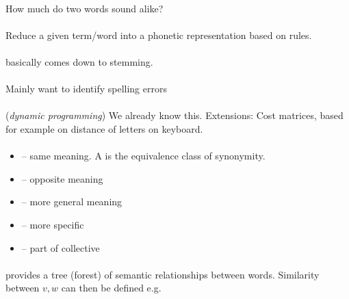 \documentclass[10pt,twocolumn]{article}
\begin{document}
\paragraph{} How much do two words sound alike?

\paragraph{ } Reduce a given term/word into a phonetic
representation based on rules.

\paragraph{} basically comes down to stemming.

\paragraph{} Mainly want to identify spelling errors

\paragraph{} (\textit{dynamic
  programming}) We already know this. Extensions: Cost matrices, based for
example on distance of letters on keyboard.

\paragraph{} 
\begin{itemize}
\item {} -- same meaning. A  is the equivalence class of synonymity.
\item {} -- opposite meaning
\item {} -- more general meaning
\item {} -- more specific
\item {} -- part of collective
\end{itemize}

\paragraph{} provides a tree (forest) of semantic relationships
between words. Similarity between $v,w$ can then be defined e.g. \todo
\end{document}
